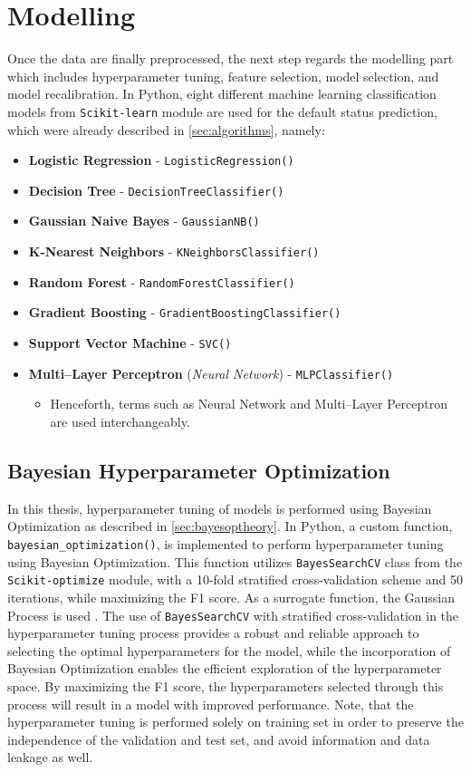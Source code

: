 \section{Modelling}
\label{sec:modelling}
Once the data are finally preprocessed, the next step regards the modelling part which includes hyperparameter tuning, feature selection, model selection, and model recalibration.
In Python, eight different machine learning classification models from \lstinline{Scikit-learn} module are used for the default status prediction, which were already described in \autoref{sec:algorithms}, namely:
\begin{itemize}\setlength\itemsep{0em}
\item \textbf{Logistic Regression} - \lstinline{LogisticRegression()}
\item \textbf{Decision Tree} - \lstinline{DecisionTreeClassifier()}
\item \textbf{Gaussian Naive Bayes} - \lstinline{GaussianNB()}
\item \textbf{K-Nearest Neighbors} - \lstinline{KNeighborsClassifier()}
\item \textbf{Random Forest} - \lstinline{RandomForestClassifier()}
\item \textbf{Gradient Boosting} - \lstinline{GradientBoostingClassifier()}
\item \textbf{Support Vector Machine} - \lstinline{SVC()}
\item \textbf{Multi--Layer Perceptron} (\textit{Neural Network}) - \lstinline{MLPClassifier()}
\begin{itemize}\setlength\itemsep{0em}
\item Henceforth, terms such as Neural Network and Multi--Layer Perceptron are used interchangeably.
\end{itemize}
\end{itemize}

\subsection{Bayesian Hyperparameter Optimization}
\label{subsec:hyperoptbayes}
In this thesis, hyperparameter tuning of models is performed using Bayesian Optimization as described in \autoref{sec:bayesoptheory}.
In Python, a custom function, \lstinline{bayesian_optimization()}, is implemented to perform hyperparameter tuning using Bayesian Optimization.
This function utilizes \lstinline{BayesSearchCV} class from the \lstinline{Scikit-optimize} module, with a 10-fold stratified cross-validation scheme and 50 iterations, while maximizing the F1 score. As a surrogate function, the Gaussian Process is used \citep{scikit-opt}.
The use of \lstinline{BayesSearchCV} with stratified cross-validation in the hyperparameter tuning process provides a robust and reliable approach to selecting the optimal hyperparameters for the model, while the incorporation of Bayesian Optimization enables the efficient exploration of the hyperparameter space.
By maximizing the F1 score, the hyperparameters selected through this process will result in a model with improved performance. Note, that the hyperparameter tuning is performed solely on training set in order to preserve the independence of the validation and test set, and avoid information and data leakage as well.

